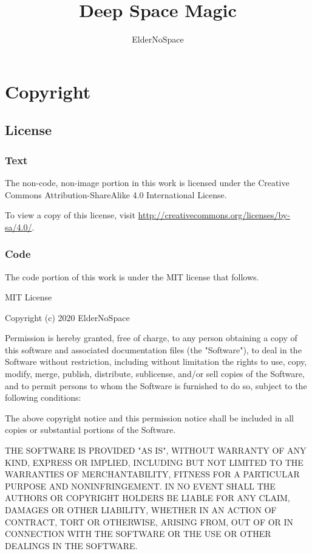\documentclass[a4paper,12pt,oneside]{book}
\title{Deep Space Magic}
\author{ElderNoSpace}
\begin{document}
    \frontmatter
    \maketitle

    \chapter{Copyright}
    \section*{License}
        \subsection*{Text}
            The non-code, non-image portion in this work is licensed under the Creative Commons Attribution-ShareAlike 4.0 International License.
        
            To view a copy of this license, visit \href{http://creativecommons.org/licenses/by-sa/4.0/}{http://creativecommons.org/licenses/by-sa/4.0/}.

        \subsection*{Code}
            The code portion of this work is under the MIT license that follows.

            MIT License

            Copyright (c) 2020 ElderNoSpace
        
            Permission is hereby granted, free of charge, to any person obtaining a copy of this software and associated documentation files (the "Software"), to deal in the Software without restriction, including without limitation the rights to use, copy, modify, merge, publish, distribute, sublicense, and/or sell copies of the Software, and to permit persons to whom the Software is furnished to do so, subject to the following conditions:
        
            The above copyright notice and this permission notice shall be included in all copies or substantial portions of the Software.
        
            THE SOFTWARE IS PROVIDED "AS IS", WITHOUT WARRANTY OF ANY KIND, EXPRESS OR IMPLIED, INCLUDING BUT NOT LIMITED TO THE WARRANTIES OF MERCHANTABILITY, FITNESS FOR A PARTICULAR PURPOSE AND NONINFRINGEMENT. IN NO EVENT SHALL THE AUTHORS OR COPYRIGHT HOLDERS BE LIABLE FOR ANY CLAIM, DAMAGES OR OTHER LIABILITY, WHETHER IN AN ACTION OF CONTRACT, TORT OR OTHERWISE, ARISING FROM, OUT OF OR IN CONNECTION WITH THE SOFTWARE OR THE USE OR OTHER DEALINGS IN THE SOFTWARE.
\end{document}
